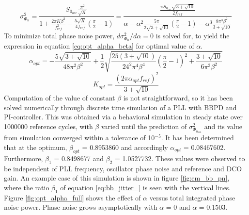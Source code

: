 	 	\begin{equation}\label{eq:total_pn_pow}
	 		\sigma^2_{\Phi_{n}} = \frac{S_{0_{osc}}\frac{\pi^2}{\sqrt{K}}}{1 + \frac{2\pi K \beta^2}{f_{ref}^2} - \frac{5\sqrt{K}}{4f_{ref}} \left(\frac{\pi}{2}-1\right)}  
	 		= \frac{\frac{\pi S_{0_{osc}}\sqrt{3+\sqrt{10}}}{2f_{ref}}}{\alpha - \alpha^2\frac{5\pi}{2\sqrt{3+\sqrt{10}}}\left(\frac{\pi}{2}-1\right) - \alpha^3 \frac{8\pi^3\beta^2}{3+\sqrt{10}}}
	 	\end{equation}
	To minimize total phase noise power, $d\sigma^2_{\Phi_{n}}/d\alpha = 0$ is solved for, to yield the expression in equation \ref{eq:opt_alpha_beta} for optimal value of $\alpha$.
	\begin{equation} \label{eq:opt_alpha_beta}
		\alpha_{opt} = -\frac{5\sqrt{3+\sqrt{10}}}{48\pi^2\beta^2}
		+ \frac{1}{2}\sqrt{ \frac{25(3+\sqrt{10})}{24^2\pi^4\beta^4}\left(\frac{\pi}{2}-1\right)^2 + \frac{3+\sqrt{10}}{6\pi^3\beta^2}} 
	\end{equation}
	\begin{equation}
		K_{opt} = \frac{(2\pi\alpha_{opt} f_{ref})^2}{3+\sqrt{10}}
	\end{equation}
	Computation of the value of constant $\beta$ is not straightforward, so it has been solved numerically through discrete time simulation of a PLL with BBPD and PI-controller. This was obtained via a behavioral simulation in steady state over 1000000 reference cycles, with $\beta$ varied until the prediction of $\sigma^2_{\Phi_{n_{em}}}$ and its value from simulation converged within a tolerance of 10$^{-5}$. It has been determined that at the optimum, $\beta_{opt}$ = 0.8953860 and accordingly $\alpha_{opt}$ = 0.08467602. Furthermore, $\beta_1$ = 0.8498677 and $\beta_2$ = 1.0527732. These values were observed to be independent of PLL frequency, oscillator phase noise and reference and DCO gain. An example case of this simulation is shown in figure \ref{fig:em_bb_pn}, where the ratio $\beta_1$ of equation \ref{eq:bb_jitter_} is seen with the vertical lines. Figure \ref{fig:opt_alpha_full} shows the effect of $\alpha$ versus total integrated phase noise power. Phase noise grows asymptotically with $\alpha$ = 0 and $\alpha$ = 0.1503. 

